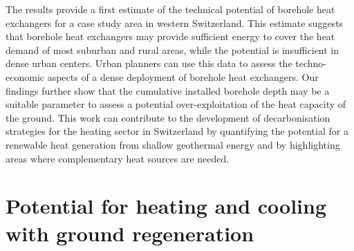 The results provide a first estimate of the technical potential of borehole heat exchangers for a case study area in western Switzerland.
This estimate suggests that borehole heat exchangers may provide sufficient energy to cover the heat demand of most suburban and rural areas, while the potential is insufficient in dense urban centers.
Urban planners can use this data to assess the techno-economic aspects of a dense deployment of borehole heat exchangers.
Our findings further show that the cumulative installed borehole depth may be a suitable parameter to assess a potential over-exploitation of the heat capacity of the ground.
%
This work can contribute to the development of decarbonisation strategies for the heating sector in Switzerland by quantifying the potential for a renewable heat generation from shallow geothermal energy and by highlighting areas where complementary heat sources are needed.


\section{Potential for heating and cooling with ground regeneration}